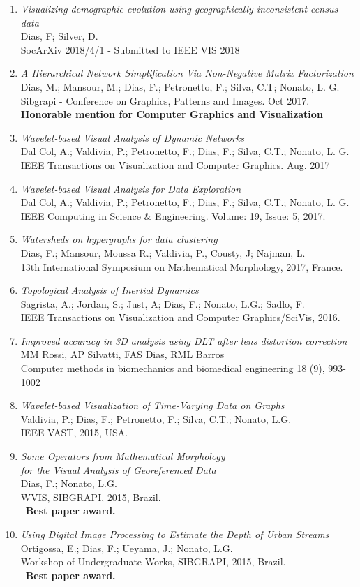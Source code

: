 \documentclass[]{friggeri-cv}
\newcommand{\pub}[3]{
  {\emph{#1}\\
    #2\\
    #3}}
\begin{document}
\begin{enumerate}
  \item{
    \pub
        {Visualizing demographic evolution using geographically inconsistent census data}
        {Dias, F; Silver, D.}
        {SocArXiv 2018/4/1 - Submitted to IEEE VIS 2018}
  }
  \item{
    \pub
        {A Hierarchical Network Simplification Via Non-Negative Matrix Factorization}
        {Dias, M.; Mansour, M.; Dias, F.; Petronetto, F.; Silva, C.T; Nonato,  L. G. }  
        {Sibgrapi - Conference on Graphics, Patterns and Images. Oct 2017.
        \\\textbf{Honorable mention for Computer Graphics and Visualization}}
  }  
\item{
  \pub
      {Wavelet-based Visual Analysis of Dynamic Networks}
      {Dal Col, A.; Valdivia, P.; Petronetto, F.; Dias, F.; Silva, C.T.; Nonato, L. G.}  
      {IEEE Transactions on Visualization and Computer Graphics. Aug. 2017}
}
\item{
  \pub
      {Wavelet-based Visual Analysis for Data Exploration}
      {Dal Col, A.; Valdivia, P.; Petronetto, F.; Dias, F.; Silva, C.T.; Nonato, L. G.}  
      {IEEE Computing in Science \& Engineering. Volume: 19, Issue: 5, 2017.}
}
\item{
  \pub
      {Watersheds on hypergraphs for data clustering}
      {Dias, F.; Mansour, Moussa R.; Valdivia, P., Cousty, J; Najman, L.}  
      {13th International Symposium on Mathematical Morphology, 2017, France.}
}
\item{
  \pub
      {Topological Analysis of Inertial Dynamics}
      {Sagrista, A.; Jordan, S.; Just, A; Dias, F.; Nonato, L.G.; Sadlo, F.}
      {IEEE Transactions on Visualization and Computer Graphics/SciVis, 2016.}
}
\item{
  \pub
      {Improved accuracy in 3D analysis using DLT after lens distortion correction}
      {MM Rossi, AP Silvatti, FAS Dias, RML Barros}
      {Computer methods in biomechanics and biomedical engineering 18 (9), 993-1002}
}
  
\item{
  \pub
      {Wavelet-based Visualization of Time-Varying Data on Graphs}
      {Valdivia, P.; Dias, F.; Petronetto, F.; Silva, C.T.; Nonato, L.G.}
      {IEEE VAST, 2015, USA.}
}
\item{
  \pub
      {Some Operators from Mathematical Morphology \\
        for the Visual Analysis of Georeferenced Data}
      {Dias, F.; Nonato, L.G.}
      {WVIS, SIBGRAPI, 2015, Brazil.}
      \\~\textbf{Best paper award.}
} 
\item{
  \pub
      {Using Digital Image Processing to Estimate the Depth of Urban Streams}
      {Ortigossa, E.; Dias, F.; Ueyama, J.; Nonato, L.G.}
      {Workshop of Undergraduate Works, SIBGRAPI, 2015, Brazil.}
      \\~\textbf{Best paper award.}
}
  

\end{enumerate}
\end{document}
